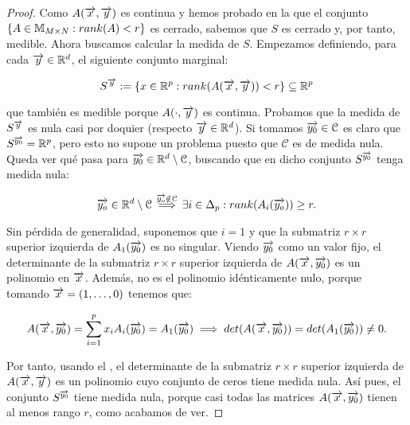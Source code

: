\begin{proof}

    Como $A(\overrightarrow{x}, \overrightarrow{y})$ es continua y hemos probado en la  que el conjunto $\{ A \in \mathbb{M}_{M \times N}: rank(A) < r \}$ es cerrado, sabemos que $S$ es cerrado y, por tanto, medible. Ahora buscamos calcular la medida de $S$. Empezamos definiendo, para cada $\overrightarrow{y} \in \mathbb{R}^d$, el siguiente conjunto marginal:

    \begin{equation}
        S^{\overrightarrow{y}} := \{ x \in \mathbb{R}^p: rank(A(\overrightarrow{x}, \overrightarrow{y})) < r \} \subseteq \mathbb{R}^p
    \end{equation}

    que también es medible porque $A(\cdot, \overrightarrow{y})$ es continua. Probamos que la medida de $S^{\overrightarrow{y}}$ es nula casi por doquier (respecto $\overrightarrow{y} \in \mathbb{R}^d$). Si tomamos $\overrightarrow{y_0} \in \mathcal{C}$ es claro que $S^{\overrightarrow{y_0}} = \mathbb{R}^p$, pero esto no supone un problema puesto que $\mathcal{C}$ es de medida nula. Queda ver qué pasa para $\overrightarrow{y_0} \in \mathbb{R}^d \setminus \mathcal{C}$, buscando que en dicho conjunto $S^{\overrightarrow{y_0}}$ tenga medida nula:

    \begin{equation}
        \overrightarrow{y_o} \in \mathbb{R}^d \setminus \mathcal{C} \stackrel{\overrightarrow{y_o} \notin \mathcal{C}}{\implies} \exists i \in \Delta_{p}: rank(A_i(\overrightarrow{y_o})) \geq r.
    \end{equation}

    Sin pérdida de generalidad, suponemos que $i = 1$ y que la submatriz $r \times r$ superior izquierda de $A_1(\overrightarrow{y_0})$ es no singular. Viendo $\overrightarrow{y_0}$ como un valor fijo, el determinante de la submatriz $r \times r$ superior izquierda de $A(\overrightarrow{x}, \overrightarrow{y_0})$ es un polinomio en $\overrightarrow{x}$. Además, no es el polinomio idénticamente nulo, porque tomando $\overrightarrow{x} = (1, \ldots, 0)$ tenemos que:

    \begin{equation}
        A(\overrightarrow{x}, \overrightarrow{y_0}) = \sum_{i = 1}^{p} x_i A_i(\overrightarrow{y_0}) = A_1(\overrightarrow{y_0}) \implies det(A(\overrightarrow{x}, \overrightarrow{y_0})) = det(A_1(\overrightarrow{y_0})) \neq 0.
    \end{equation}

    Por tanto, usando el , el determinante de la submatriz $r \times r$ superior izquierda de $A(\overrightarrow{x}, \overrightarrow{y})$ es un polinomio cuyo conjunto de ceros tiene medida nula. Así pues, el conjunto $S^{\overrightarrow{y_0}}$ tiene medida nula, porque casi todas las matrices $A(\overrightarrow{x}, \overrightarrow{y_0})$ tienen al menos rango $r$, como acabamos de ver.


\end{proof}
